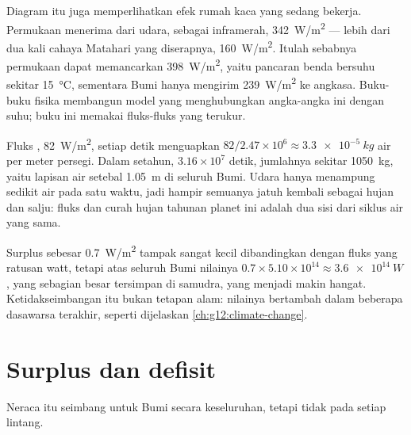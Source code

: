 Diagram itu juga memperlihatkan efek rumah kaca yang sedang bekerja.
Permukaan menerima dari udara, sebagai inframerah, \qty{342}{W/m^2} --- lebih
dari dua kali cahaya Matahari yang diserapnya, \qty{160}{W/m^2}. Itulah
sebabnya permukaan dapat memancarkan \qty{398}{W/m^2}, yaitu pancaran benda
bersuhu sekitar \qty{15}{\degreeCelsius}, sementara Bumi hanya mengirim
\qty{239}{W/m^2} ke angkasa. Buku-buku fisika membangun model yang
menghubungkan angka-angka ini dengan suhu; buku ini memakai fluks-fluks yang
terukur.

\begin{example}\label{ex:g10:earth-energy-budget:evaporation}
Fluks , \qty{82}{W/m^2}, setiap detik menguapkan $82/2.47\times
10^6 \approx \qty{3.3e-5}{kg}$ air per meter persegi. Dalam setahun,
$3.16\times10^7$ detik, jumlahnya sekitar \qty{1050}{kg}, yaitu lapisan air
setebal \qty{1.05}{m} di seluruh Bumi. Udara hanya menampung sedikit air pada
satu waktu, jadi hampir semuanya jatuh kembali sebagai hujan dan salju: fluks
 dan curah hujan tahunan planet ini adalah dua sisi dari siklus air
yang sama.
\end{example}

\begin{remark}[Ketidakseimbangan]\label{rem:g10:earth-energy-budget:imbalance}
Surplus sebesar \qty{0.7}{W/m^2} tampak sangat kecil dibandingkan dengan fluks
yang ratusan watt, tetapi atas seluruh Bumi nilainya $0.7 \times 5.10\times10^{14} \approx
\qty{3.6e14}{W}$, yang sebagian besar tersimpan di
samudra, yang menjadi makin hangat. Ketidakseimbangan itu bukan tetapan alam:
nilainya bertambah dalam beberapa dasawarsa terakhir, seperti dijelaskan
\cref{ch:g12:climate-change}.
\end{remark}

\section{Surplus dan defisit}

Neraca itu seimbang untuk Bumi secara keseluruhan, tetapi tidak pada setiap lintang.

